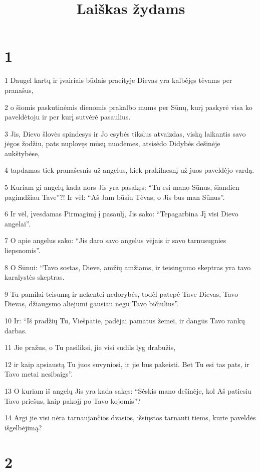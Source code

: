 

\title{Laiškas žydams}


\chapter{1}


\par 1 Daugel kartų ir įvairiais būdais praeityje Dievas yra kalbėjęs tėvams per pranašus, 
\par 2 o šiomis paskutinėmis dienomis prakalbo mums per Sūnų, kurį paskyrė visa ko paveldėtoju ir per kurį sutvėrė pasaulius. 
\par 3 Jis, Dievo šlovės spindesys ir Jo esybės tikslus atvaizdas, viską laikantis savo jėgos žodžiu, pats nuplovęs mūsų nuodėmes, atsisėdo Didybės dešinėje aukštybėse, 
\par 4 tapdamas tiek pranašesnis už angelus, kiek prakilnesnį už juos paveldėjo vardą. 
\par 5 Kuriam gi angelų kada nors Jis yra pasakęs: “Tu esi mano Sūnus, šiandien pagimdžiau Tave”?! Ir vėl: “Aš Jam būsiu Tėvas, o Jis bus man Sūnus”. 
\par 6 Ir vėl, įvesdamas Pirmagimį į pasaulį, Jis sako: “Tepagarbina Jį visi Dievo angelai”. 
\par 7 O apie angelus sako: “Jis daro savo angelus vėjais ir savo tarnus­ugnies liepsnomis”. 
\par 8 O Sūnui: “Tavo sostas, Dieve, amžių amžiams, ir teisingumo skeptras yra tavo karalystės skeptras. 
\par 9 Tu pamilai teisumą ir nekentei nedorybės, todėl patepė Tave Dievas, Tavo Dievas, džiaugsmo aliejumi gausiau negu Tavo bičiulius”. 
\par 10 Ir: “Iš pradžių Tu, Viešpatie, padėjai pamatus žemei, ir dangūs­ Tavo rankų darbas. 
\par 11 Jie pražus, o Tu pasiliksi, jie visi sudils lyg drabužis, 
\par 12 ir kaip apsiaustą Tu juos suvyniosi, ir jie bus pakeisti. Bet Tu esi tas pats, ir Tavo metai nesibaigs”. 
\par 13 O kuriam iš angelų Jis yra kada sakęs: “Sėskis mano dešinėje, kol Aš patiesiu Tavo priešus, kaip pakojį po Tavo kojomis”? 
\par 14 Argi jie visi nėra tarnaujančios dvasios, išsiųstos tarnauti tiems, kurie paveldės išgelbėjimą?


\chapter{2}


